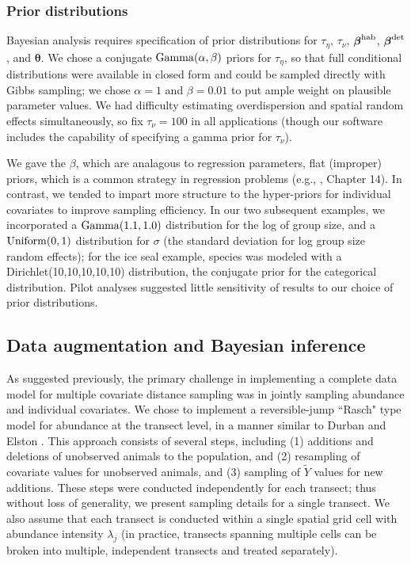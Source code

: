 \documentclass[10pt]{article}
\begin{document}
\subsubsection*{Prior distributions}

Bayesian analysis requires specification of prior distributions for $\tau_\eta$, $\tau_\nu$, $\boldsymbol{\beta}^{\rm hab}$, $\boldsymbol{\beta}^{\rm det}$, and $\boldsymbol{\theta}$.  We chose a conjugate ${\rm Gamma}(\alpha,\beta)$ priors for $\tau_\eta$, so that full conditional distributions were available in closed form and could be sampled directly with Gibbs sampling; we chose $\alpha=1$ and $\beta=0.01$ to put ample weight on plausible parameter values. We had difficulty estimating overdispersion and spatial random effects simultaneously, so fix $\tau_\nu=100$ in all applications (though our software includes the capability of specifying a gamma prior for $\tau_\nu$). 

We gave the $\beta$, which are analagous to regression parameters, flat (improper) priors, which is a common strategy in regression problems (e.g., \cite{GelmanEtAl2004}, Chapter 14).  In contrast, we tended to impart more structure to the hyper-priors for individual covariates to improve sampling efficiency.  In our two subsequent examples, we incorporated a ${\rm Gamma}(1.1,1.0)$ distribution for the log of group size, and a ${\rm Uniform}(0,1)$ distribution for $\sigma$ (the standard deviation for log group size random effects); for the ice seal example, species was modeled with a Dirichlet(10,10,10,10,10) distribution, the conjugate prior for the categorical distribution.  Pilot analyses suggested little sensitivity of results to our choice of prior distributions.

\subsection*{Data augmentation and Bayesian inference}

As suggested previously, the primary challenge in implementing a complete data model for multiple covariate distance sampling was in jointly sampling abundance and individual covariates.  We chose to implement a reversible-jump ``Rasch" type model for abundance at the transect level, in a manner similar to Durban and Elston \cite{DurbanElston2005}.  This approach consists of several steps, including (1) additions and deletions of unobserved animals to the population, and (2) resampling of covariate values for unobserved animals, and (3) sampling of $\tilde{Y}$ values for new additions. These steps were conducted independently for each transect; thus without loss of generality, we present sampling details for a single transect. We also assume that each transect is conducted within a single spatial grid cell with abundance intensity $\lambda_j$ (in practice, transects spanning multiple cells can be broken into multiple, independent transects and treated separately).
\end{document}
